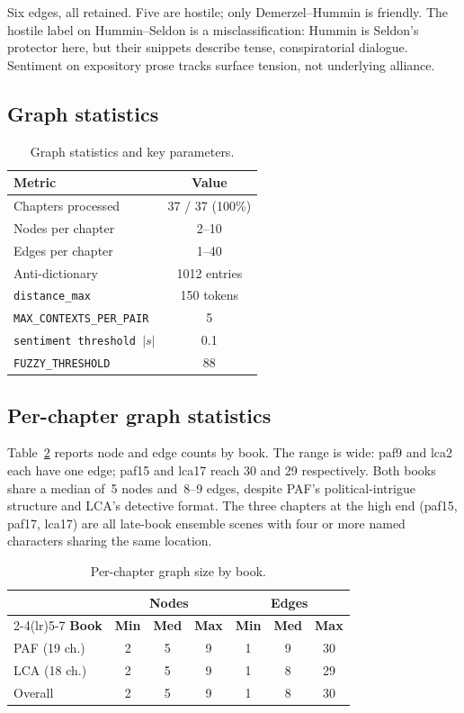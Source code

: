 \documentclass[a4paper]{article}
\begin{document}
Six edges, all retained. Five are hostile; only Demerzel--Hummin
is friendly. The hostile label on Hummin--Seldon is a
misclassification: Hummin is Seldon's protector here, but their
snippets describe tense, conspiratorial dialogue. Sentiment on
expository prose tracks surface tension, not underlying alliance.

\subsection{Graph statistics}

\begin{table}[h]
\centering
\caption{Graph statistics and key parameters.}
\label{tab:stats}
\setlength{\tabcolsep}{4pt}
\small
\begin{tabular}{lc}
\toprule
\textbf{Metric} & \textbf{Value} \\
\midrule
Chapters processed   & 37 / 37 (100\%) \\
Nodes per chapter    & 2--10 \\
Edges per chapter    & 1--40 \\
Anti-dictionary      & 1012 entries \\
\texttt{distance\_max}         & 150 tokens \\
\texttt{MAX\_CONTEXTS\_PER\_PAIR} & 5 \\
\texttt{sentiment threshold $|s|$} & 0.1 \\
\texttt{FUZZY\_THRESHOLD}      & 88 \\
\bottomrule
\end{tabular}
\end{table}

\subsection{Per-chapter graph statistics}

Table~\ref{tab:perstats} reports node and edge counts by book.
The range is wide: paf9 and lca2 each have one edge; paf15 and
lca17 reach 30 and 29 respectively. Both books share a median
of~5 nodes and~8--9 edges, despite PAF's political-intrigue
structure and LCA's detective format. The three chapters at the
high end (paf15, paf17, lca17) are all late-book ensemble scenes
with four or more named characters sharing the same location.

\begin{table}[h]
\centering
\caption{Per-chapter graph size by book.}
\label{tab:perstats}
\setlength{\tabcolsep}{5pt}
\small
\begin{tabular}{lcccccc}
\toprule
 & \multicolumn{3}{c}{\textbf{Nodes}} & \multicolumn{3}{c}{\textbf{Edges}} \\
\cmidrule(lr){2-4}\cmidrule(lr){5-7}
\textbf{Book} & \textbf{Min} & \textbf{Med} & \textbf{Max} & \textbf{Min} & \textbf{Med} & \textbf{Max} \\
\midrule
PAF (19 ch.) & 2 & 5 & 9  & 1 & 9  & 30 \\
LCA (18 ch.) & 2 & 5 & 9  & 1 & 8 & 29 \\
\midrule
Overall      & 2 & 5 & 9  & 1 & 8  & 30 \\
\bottomrule
\end{tabular}
\end{table}
\end{document}
